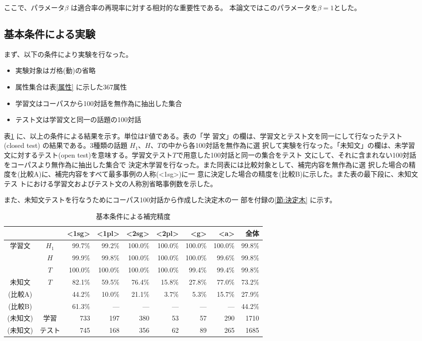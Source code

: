 ここで、パラメータ$\beta$ は適合率の再現率に対する相対的な重要性である。
本論文ではこのパラメータを$\beta=1$とした。


\subsection{基本条件による実験}

まず、以下の条件により実験を行なった。

\begin{itemize}
\item 実験対象はガ格(動)の省略
\item 属性集合は表\ref{属性} に示した367属性
\item 学習文はコーパスから100対話を無作為に抽出した集合
\item テスト文は学習文と同一の話題の100対話
\end{itemize}

表\ref{標準} に、以上の条件による結果を示す。単位はF値である。表の「学
習文」の欄は、学習文とテスト文を同一にして行なったテスト(closed test)
の結果である。3種類の話題 $H_1$、$H$、$T$の中から各100対話を無作為に選
択して実験を行なった。「未知文」の欄は、未学習文に対するテスト(open
test)を意味する。学習文テスト$T$で用意した100対話と同一の集合をテスト
文にして、それに含まれない100対話をコーパスより無作為に抽出した集合で
決定木学習を行なった。また同表には比較対象として、補完内容を無作為に選
択した場合の精度を(比較A)に、補完内容をすべて最多事例の人称(<1sg>)に一
意に決定した場合の精度を(比較B)に示した。また表の最下段に、未知文テス
トにおける学習文およびテスト文の人称別省略事例数を示した。

また、未知文テストを行なうためにコーパス100対話から作成した決定木の一
部を付録の\ref{節:決定木} に示す。


\begin{table}
\begin{center}
\caption{基本条件による補完精度}
\label{標準}
\begin{tabular}{cc|*{6}{r}|r}
\hline\hline
        &        &<1sg> &<1pl> &<2sg> &<2pl> & <g>  & <a>  & 全体 \\
\hline       
学習文  &$H_1$ & 99.7\% & 99.2\% &100.0\% &100.0\% &100.0\% &100.0\% & 99.8\%\\
        &$H$   & 99.9\% & 99.8\% &100.0\% &100.0\% &100.0\% & 99.6\% & 99.8\%\\
        &$T$   &100.0\% &100.0\% &100.0\% &100.0\% & 99.4\% & 99.4\% & 99.8\%\\
\hline       
未知文  &$T$   & 82.1\% & 59.5\% & 76.4\% & 15.8\% & 27.8\% & 77.0\% & 73.2\%\\
\hline       
(比較A) &      & 44.2\% & 10.0\% & 21.1\% &  3.7\% &  5.3\% & 15.7\% & 27.9\%\\
(比較B) &      & 61.3\% &  --- &  --- &  --- &  --- &  --- & 44.2\% \\
\hline\hline
(未知文)&学習  & 733  & 197  & 380  &  53  &  57  & 290  & 1710 \\
(未知文)&テスト& 745  & 168  & 356  &  62  &  89  & 265  & 1685 \\
\hline
\end{tabular}
\end{center}
\end{table}

